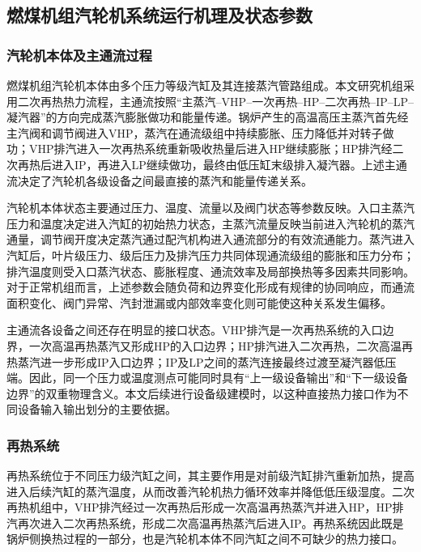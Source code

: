 \subsection{燃煤机组汽轮机系统运行机理及状态参数}
\label{subsec:turbine_mechanism_v3}

\subsubsection{汽轮机本体及主通流过程}

燃煤机组汽轮机本体由多个压力等级汽缸及其连接蒸汽管路组成。本文研究机组采用二次再热热力流程，主通流按照“主蒸汽--VHP--一次再热--HP--二次再热--IP--LP--凝汽器”的方向完成蒸汽膨胀做功和能量传递。锅炉产生的高温高压主蒸汽首先经主汽阀和调节阀进入VHP，蒸汽在通流级组中持续膨胀、压力降低并对转子做功；VHP排汽进入一次再热系统重新吸收热量后进入HP继续膨胀；HP排汽经二次再热后进入IP，再进入LP继续做功，最终由低压缸末级排入凝汽器。上述主通流决定了汽轮机各级设备之间最直接的蒸汽和能量传递关系。

汽轮机本体状态主要通过压力、温度、流量以及阀门状态等参数反映。入口主蒸汽压力和温度决定进入汽缸的初始热力状态，主蒸汽流量反映当前进入汽轮机的蒸汽通量，调节阀开度决定蒸汽通过配汽机构进入通流部分的有效流通能力。蒸汽进入汽缸后，叶片级压力、级后压力及排汽压力共同体现通流级组的膨胀和压力分布；排汽温度则受入口蒸汽状态、膨胀程度、通流效率及局部换热等多因素共同影响。对于正常机组而言，上述参数会随负荷和边界变化形成有规律的协同响应，而通流面积变化、阀门异常、汽封泄漏或内部效率变化则可能使这种关系发生偏移。

主通流各设备之间还存在明显的接口状态。VHP排汽是一次再热系统的入口边界，一次高温再热蒸汽又形成HP的入口边界；HP排汽进入二次再热，二次高温再热蒸汽进一步形成IP入口边界；IP及LP之间的蒸汽连接最终过渡至凝汽器低压端。因此，同一个压力或温度测点可能同时具有“上一级设备输出”和“下一级设备边界”的双重物理含义。本文后续进行设备级建模时，以这种直接热力接口作为不同设备输入输出划分的主要依据。

\subsubsection{再热系统}

再热系统位于不同压力级汽缸之间，其主要作用是对前级汽缸排汽重新加热，提高进入后续汽缸的蒸汽温度，从而改善汽轮机热力循环效率并降低低压级湿度。二次再热机组中，VHP排汽经过一次再热后形成一次高温再热蒸汽并进入HP，HP排汽再次进入二次再热系统，形成二次高温再热蒸汽后进入IP。再热系统因此既是锅炉侧换热过程的一部分，也是汽轮机本体不同汽缸之间不可缺少的热力接口。

